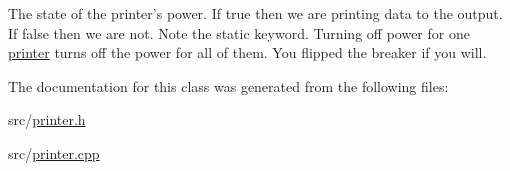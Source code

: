 The state of the printer's power. If true then we are printing data to the output. If false then we are not. Note the static keyword. Turning off power for one \hyperlink{classJKBuilder_1_1printer}{printer} turns off the power for all of them. You flipped the breaker if you will. 

The documentation for this class was generated from the following files:\begin{DoxyCompactItemize}
\item 
src/\hyperlink{printer_8h}{printer.h}\item 
src/\hyperlink{printer_8cpp}{printer.cpp}\end{DoxyCompactItemize}
